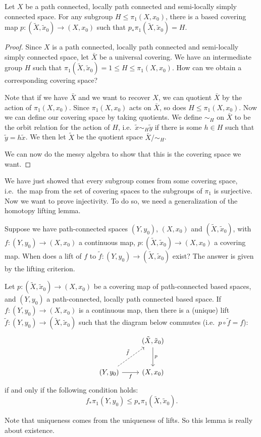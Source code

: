 \documentclass[a4paper]{article}
\begin{document}
\begin{prop}
  Let $X$ be a path connected, locally path connected and semi-locally simply connected space. For any subgroup $H \leq \pi_1(X, x_0)$, there is a based covering map $p: (\tilde{X}, \tilde{x}_0)\to (X, x_0)$ such that $p_* \pi_1(\tilde{X}, \tilde{x}_0) = H$.
\end{prop}

\begin{proof}
  Since $X$ is a path connected, locally path connected and semi-locally simply connected space, let $\bar{X}$ be a universal covering. We have an intermediate group $H$ such that $\pi_1(\tilde{X}, \tilde{x}_0) = 1 \leq H \leq \pi_1(X, x_0)$. How can we obtain a corresponding covering space?

  Note that if we have $\bar{X}$ and we want to recover $X$, we can quotient $\bar{X}$ by the action of $\pi_1(X, x_0)$. Since $\pi_1(X, x_0)$ acts on $\bar{X}$, so does $H \leq \pi_1(X, x_0)$. Now we can define our covering space by taking quotients. We define $\sim_H$ on $\bar{X}$ to be the orbit relation for the action of $H$, i.e.\ $\tilde{x} \sim_H \tilde{y}$ if there is some $h \in H$ such that $\tilde{y} = h\tilde{x}$. We then let $\tilde{X}$ be the quotient space $\bar{X}/{\sim_H}$.

  We can now do the messy algebra to show that this is the covering space we want. %
\end{proof}
We have just showed that every subgroup comes from some covering space, i.e.\ the map from the set of covering spaces to the subgroups of $\pi_1$ is surjective. Now we want to prove injectivity. To do so, we need a generalization of the homotopy lifting lemma.

Suppose we have path-connected spaces $(Y, y_0)$, $(X, x_0)$ and $(\tilde{X}, \tilde{x}_0)$, with $f: (Y, y_0) \to (X, x_0)$ a continuous map, $p: (\tilde{X}, \tilde{x}_0) \to (X, x_0)$ a covering map. When does a lift of $f$ to $\tilde{f}: (Y, y_0) \to (\tilde{X}, \tilde{x}_0)$ exist? The answer is given by the lifting criterion.

\begin{lemma}
  Let $p: (\tilde{X}, \tilde{x}_0) \to (X, x_0)$ be a covering map of path-connected based spaces, and $(Y, y_0)$ a path-connected, locally path connected based space. If $f: (Y, y_0) \to (X, x_0)$ is a continuous map, then there is a (unique) lift $\tilde{f}: (Y, y_0) \to (\tilde{X}, \tilde{x}_0)$ such that the diagram below commutes (i.e.\ $p\circ \tilde{f} = f$):
  \[
    \begin{tikzcd}[row sep=large]
      & (\tilde{X}, \tilde{x}_0) \ar[d, "p"]\\
      (Y, y_0) \ar [r, "f"'] \ar [ru, dashed, "\tilde{f}"] & (X, x_0)
    \end{tikzcd}
  \]
  if and only if the following condition holds:
  \[
    f_* \pi_1(Y, y_0) \leq p_*\pi_1(\tilde{X}, \tilde{x}_0).
  \]
\end{lemma}
Note that uniqueness comes from the uniqueness of lifts. So this lemma is really about existence.
\end{document}
